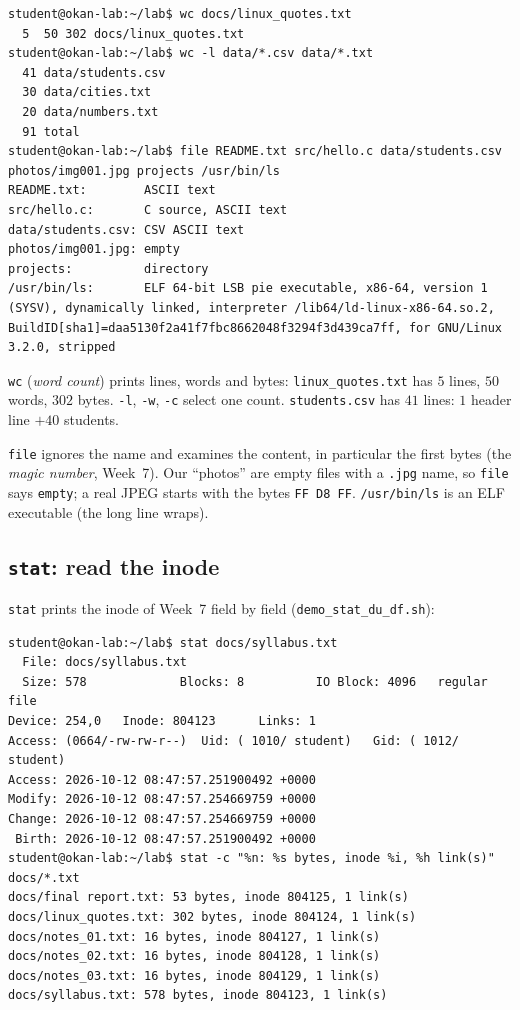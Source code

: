 \documentclass[11pt,a4paper]{article}
\newcommand{\cmd}[1]{\texttt{#1}}
\begin{document}
\begin{lstlisting}[style=term]
student@okan-lab:~/lab$ wc docs/linux_quotes.txt
  5  50 302 docs/linux_quotes.txt
student@okan-lab:~/lab$ wc -l data/*.csv data/*.txt
  41 data/students.csv
  30 data/cities.txt
  20 data/numbers.txt
  91 total
student@okan-lab:~/lab$ file README.txt src/hello.c data/students.csv photos/img001.jpg projects /usr/bin/ls
README.txt:        ASCII text
src/hello.c:       C source, ASCII text
data/students.csv: CSV ASCII text
photos/img001.jpg: empty
projects:          directory
/usr/bin/ls:       ELF 64-bit LSB pie executable, x86-64, version 1 (SYSV), dynamically linked, interpreter /lib64/ld-linux-x86-64.so.2, BuildID[sha1]=daa5130f2a41f7fbc8662048f3294f3d439ca7ff, for GNU/Linux 3.2.0, stripped
\end{lstlisting}

\cmd{wc} (\emph{word count}) prints lines, words and bytes: \texttt{linux\_quotes.txt} has $5$ lines, $50$ words, $302$ bytes. \cmd{-l}, \cmd{-w}, \cmd{-c} select one count. \texttt{students.csv} has $41$ lines: $1$ header line $+ 40$ students.

\cmd{file} ignores the name and examines the content, in particular the first bytes (the \emph{magic number}, Week~7). Our ``photos'' are empty files with a \texttt{.jpg} name, so \cmd{file} says \texttt{empty}; a real JPEG starts with the bytes \texttt{FF D8 FF}. \texttt{/usr/bin/ls} is an ELF executable (the long line wraps).

\subsection{\texttt{stat}: read the inode}
\label{sec:stat}

\cmd{stat} prints the inode of Week~7 field by field (\cmd{demo\_stat\_du\_df.sh}):

\begin{lstlisting}[style=term]
student@okan-lab:~/lab$ stat docs/syllabus.txt
  File: docs/syllabus.txt
  Size: 578             Blocks: 8          IO Block: 4096   regular file
Device: 254,0   Inode: 804123      Links: 1
Access: (0664/-rw-rw-r--)  Uid: ( 1010/ student)   Gid: ( 1012/ student)
Access: 2026-10-12 08:47:57.251900492 +0000
Modify: 2026-10-12 08:47:57.254669759 +0000
Change: 2026-10-12 08:47:57.254669759 +0000
 Birth: 2026-10-12 08:47:57.251900492 +0000
student@okan-lab:~/lab$ stat -c "%n: %s bytes, inode %i, %h link(s)" docs/*.txt
docs/final report.txt: 53 bytes, inode 804125, 1 link(s)
docs/linux_quotes.txt: 302 bytes, inode 804124, 1 link(s)
docs/notes_01.txt: 16 bytes, inode 804127, 1 link(s)
docs/notes_02.txt: 16 bytes, inode 804128, 1 link(s)
docs/notes_03.txt: 16 bytes, inode 804129, 1 link(s)
docs/syllabus.txt: 578 bytes, inode 804123, 1 link(s)
\end{lstlisting}
\end{document}
